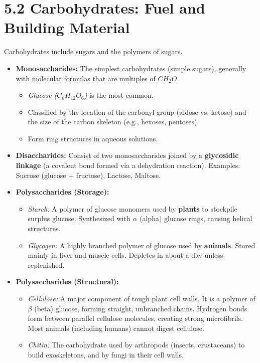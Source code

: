 \documentclass[11pt, a4paper]{article}
\begin{document}
\section*{5.2 Carbohydrates: Fuel and Building Material}
Carbohydrates include sugars and the polymers of sugars.
\begin{itemize}
    \item \textbf{Monosaccharides:} The simplest carbohydrates (simple sugars), generally with molecular formulas that are multiples of $CH_2O$. 
    \begin{itemize}
        \item \textit{Glucose ($C_6H_{12}O_6$)} is the most common. 
        \item Classified by the location of the carbonyl group (aldose vs. ketose) and the size of the carbon skeleton (e.g., hexoses, pentoses).
        \item Form ring structures in aqueous solutions.
    \end{itemize}
    \item \textbf{Disaccharides:} Consist of two monosaccharides joined by a \textbf{glycosidic linkage} (a covalent bond formed via a dehydration reaction). Examples: Sucrose (glucose + fructose), Lactose, Maltose.
    \item \textbf{Polysaccharides (Storage):}
    \begin{itemize}
        \item \textit{Starch:} A polymer of glucose monomers used by \textbf{plants} to stockpile surplus glucose. Synthesized with $\alpha$ (alpha) glucose rings, causing helical structures.
        \item \textit{Glycogen:} A highly branched polymer of glucose used by \textbf{animals}. Stored mainly in liver and muscle cells. Depletes in about a day unless replenished.
    \end{itemize}
    \item \textbf{Polysaccharides (Structural):}
    \begin{itemize}
        \item \textit{Cellulose:} A major component of tough plant cell walls. It is a polymer of $\beta$ (beta) glucose, forming straight, unbranched chains. Hydrogen bonds form between parallel cellulose molecules, creating strong microfibrils. Most animals (including humans) cannot digest cellulose.
        \item \textit{Chitin:} The carbohydrate used by arthropods (insects, crustaceans) to build exoskeletons, and by fungi in their cell walls.
    \end{itemize}
\end{itemize}
\end{document}

